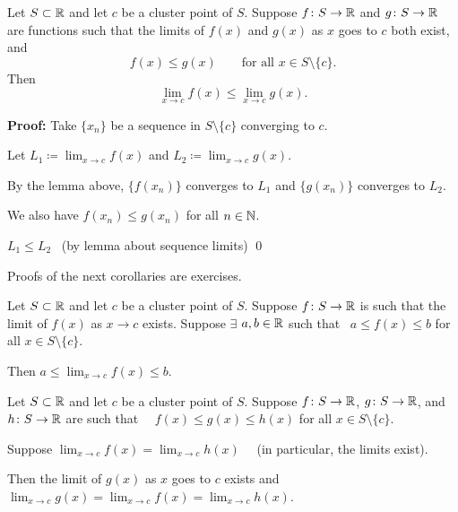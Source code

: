 \documentclass[10pt,aspectratio=149]{beamer}
\begin{document}
\begin{frame}

\begin{corollary}
Let $S \subset {\mathbb{R}}$ and let $c$ be a cluster point of $S$.  
Suppose $f \colon S \to
{\mathbb{R}}$ and $g \colon S \to {\mathbb{R}}$ are functions
such that
the limits of $f(x)$ and $g(x)$ as $x$ goes to $c$ both exist,
and
\begin{equation*}
f(x) \leq g(x) \qquad \text{for all } x \in S \setminus \{ c \}.
\end{equation*}
\pause
Then
\begin{equation*}
\lim_{x\to c} f(x) \leq \lim_{x\to c} g(x) .
\end{equation*}
\end{corollary}

\pause
\textbf{Proof:}
Take $\{ x_n \}$ be a sequence in $S \setminus \{ c \}$
converging to $c$.

\pause
\medskip

Let \quad
$\displaystyle L_1 \coloneqq \lim_{x\to c} f(x)$
\quad and \quad
$\displaystyle L_2 \coloneqq \lim_{x\to c} g(x)$.

\pause
\medskip

By the lemma above,
$\{ f(x_n) \}$ converges to $L_1$ and $\{ g(x_n) \}$ converges to $L_2$.

\pause
\medskip

We also have $f(x_n) \leq g(x_n)$ for all $n \in {\mathbb{N}}$.

\pause
\medskip

\thus \quad $L_1 \leq L_2$ ~(by lemma about sequence limits)
\qed
\end{frame}

\begin{frame}

Proofs of the next corollaries are exercises.

\pause
\begin{corollary}
Let $S \subset {\mathbb{R}}$ and let $c$ be a cluster point of $S$.  Suppose $f \colon S \to
{\mathbb{R}}$ is such that the limit of $f(x)$ as $x \to c$ exists.
Suppose $\exists$ $a,b \in {\mathbb{R}}$ such that
~$a \leq f(x) \leq b$ for all $x \in S \setminus \{ c \}$.

\pause
\medskip

Then \quad $\displaystyle a \leq \lim_{x\to c} f(x) \leq b$.
\end{corollary}

\pause
\begin{corollary}
Let $S \subset {\mathbb{R}}$ and let $c$ be a cluster point of $S$.
Suppose $f \colon S \to {\mathbb{R}}$,
$g \colon S \to {\mathbb{R}}$, and $h \colon S \to {\mathbb{R}}$ are such that
~~$f(x) \leq g(x) \leq h(x)$ for all $x \in S \setminus \{ c \}$.

\pause
\medskip

Suppose $\displaystyle \lim_{x\to c} f(x) = \lim_{x\to c} h(x)$
~~(in particular, the limits exist).

\pause
\medskip

Then the limit of $g(x)$ as $x$ goes to $c$ exists and
~~$\displaystyle \lim_{x\to c} g(x) =
\lim_{x\to c} f(x) = \lim_{x\to c} h(x)$.
\end{corollary}

\end{frame}
\end{document}
